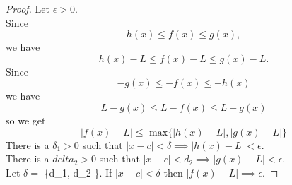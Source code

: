         \begin{proof}
            Let $\epsilon > 0$. \\
            Since
            \[
                h(x) \leq f(x) \leq g(x),
            \]
            we have
            \[
                h(x) - L \leq f(x) - L \leq g(x) - L.
            \]
            Since
            \[
                -g(x) \leq - f(x) \leq - h(x)
            \]
            we have
            \[
                L - g(x) \leq L - f(x) \leq L - g(x)
            \]
            so we get
            \[
                |f(x)-L| \leq \text{ max}\{|h(x)-L|, |g(x)-L|\}
            \]
            There is a $\delta_1 > 0$ such that $|x-c| < \delta\implies |h(x)-L| < \epsilon$. \\
            There is a $delta_2 > 0$ such that $|x-c| < d_2 \implies |g(x) - L| < \epsilon$. \\
            Let $\delta = $ \{d_1, d_2 \}. If $|x-c| < \delta$ then $|f(x) - L|\implies \epsilon$.
        \end{proof}